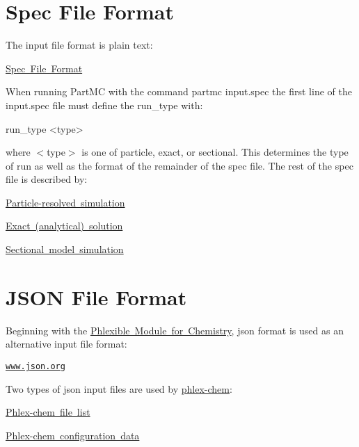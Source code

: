 \hypertarget{input_format_ss_spec_file}{}\section{Spec File Format}\label{input_format_ss_spec_file}
The input file format is plain text\+:

\mbox{\hyperlink{spec_file_format}{Spec File Format}}

When running Part\+MC with the command {\ttfamily partmc input.\+spec} the first line of the {\ttfamily input.\+spec} file must define the {\ttfamily run\+\_\+type} with\+: 
\begin{DoxyPre}
 run\_type <type>
 \end{DoxyPre}
 where {\ttfamily $<$type$>$} is one of {\ttfamily particle}, {\ttfamily exact}, or {\ttfamily sectional}. This determines the type of run as well as the format of the remainder of the spec file. The rest of the spec file is described by\+:

\mbox{\hyperlink{input_format_particle}{Particle-\/resolved simulation}}

\mbox{\hyperlink{input_format_exact}{Exact (analytical) solution}}

\mbox{\hyperlink{input_format_sectional}{Sectional model simulation}}\hypertarget{input_format_ss_json}{}\section{J\+S\+O\+N File Format}\label{input_format_ss_json}
Beginning with the \mbox{\hyperlink{phlex_chem}{Phlexible Module for Chemistry}}, {\ttfamily json} format is used as an alternative input file format\+:

\href{https://www.json.org}{\tt www.\+json.\+org}

Two types of {\ttfamily json} input files are used by \mbox{\hyperlink{phlex_chem}{phlex-\/chem}}\+:

\mbox{\hyperlink{input_format_phlex_file_list}{Phlex-\/chem file list}}

\mbox{\hyperlink{input_format_phlex_config}{Phlex-\/chem configuration data}}

